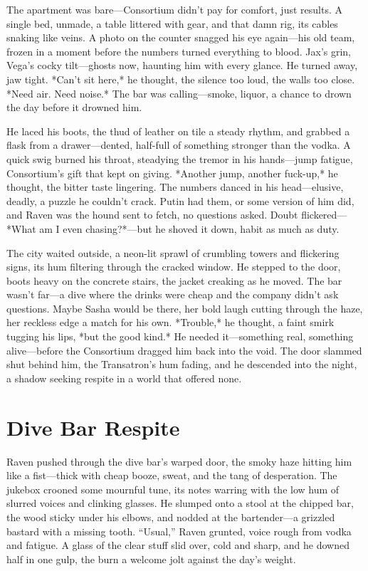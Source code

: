 \documentclass[12pt]{book}
\begin{document}
The apartment was bare—Consortium didn’t pay for comfort, just results. A single bed, unmade, a table littered with gear, and that damn rig, its cables snaking like veins. A photo on the counter snagged his eye again—his old team, frozen in a moment before the numbers turned everything to blood. Jax’s grin, Vega’s cocky tilt—ghosts now, haunting him with every glance. He turned away, jaw tight. *Can’t sit here,* he thought, the silence too loud, the walls too close. *Need air. Need noise.* The bar was calling—smoke, liquor, a chance to drown the day before it drowned him.

He laced his boots, the thud of leather on tile a steady rhythm, and grabbed a flask from a drawer—dented, half-full of something stronger than the vodka. A quick swig burned his throat, steadying the tremor in his hands—jump fatigue, Consortium’s gift that kept on giving. *Another jump, another fuck-up,* he thought, the bitter taste lingering. The numbers danced in his head—elusive, deadly, a puzzle he couldn’t crack. Putin had them, or some version of him did, and Raven was the hound sent to fetch, no questions asked. Doubt flickered—*What am I even chasing?*—but he shoved it down, habit as much as duty.

The city waited outside, a neon-lit sprawl of crumbling towers and flickering signs, its hum filtering through the cracked window. He stepped to the door, boots heavy on the concrete stairs, the jacket creaking as he moved. The bar wasn’t far—a dive where the drinks were cheap and the company didn’t ask questions. Maybe Sasha would be there, her bold laugh cutting through the haze, her reckless edge a match for his own. *Trouble,* he thought, a faint smirk tugging his lips, *but the good kind.* He needed it—something real, something alive—before the Consortium dragged him back into the void. The door slammed shut behind him, the Transatron’s hum fading, and he descended into the night, a shadow seeking respite in a world that offered none.

\section{Dive Bar Respite}

Raven pushed through the dive bar’s warped door, the smoky haze hitting him like a fist—thick with cheap booze, sweat, and the tang of desperation. The jukebox crooned some mournful tune, its notes warring with the low hum of slurred voices and clinking glasses. He slumped onto a stool at the chipped bar, the wood sticky under his elbows, and nodded at the bartender—a grizzled bastard with a missing tooth. “Usual,” Raven grunted, voice rough from vodka and fatigue. A glass of the clear stuff slid over, cold and sharp, and he downed half in one gulp, the burn a welcome jolt against the day’s weight.
\end{document}
